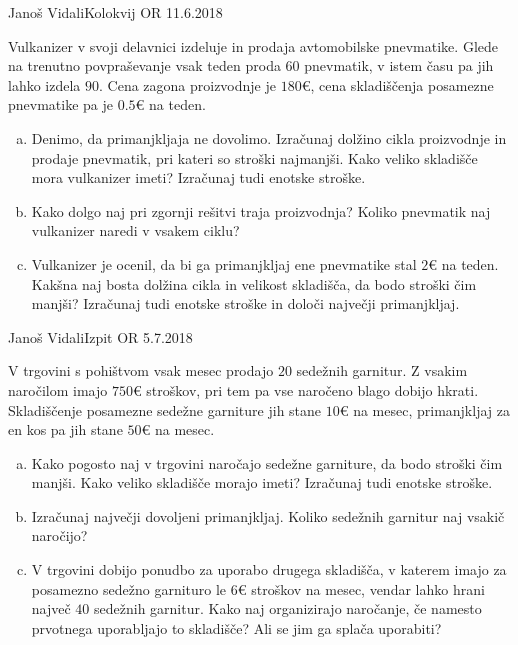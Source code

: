\begin{naloga}{Janoš Vidali}{Kolokvij OR 11.6.2018}
\begin{vprasanje}[vulkanizer]
Vulkanizer v svoji delavnici izdeluje in prodaja avtomobilske pnevmatike.
Glede na trenutno povpraševanje vsak teden proda $60$ pnevmatik,
v istem času pa jih lahko izdela $90$.
Cena zagona proizvodnje je $180 €$,
cena skladiščenja posamezne pnevmatike pa je $0.5 €$ na teden.

\begin{enumerate}[(a)]
\item Denimo, da primanjkljaja ne dovolimo.
Izračunaj dolžino cikla pro\-iz\-vod\-nje in prodaje pnevmatik,
pri kateri so stroški najmanjši.
Kako veliko skladišče mora vulkanizer imeti?
Izračunaj tudi enotske stroške.

\item Kako dolgo naj pri zgornji rešitvi traja proizvodnja?
Koliko pnevmatik naj vulkanizer naredi v vsakem ciklu?

\item Vulkanizer je ocenil,
da bi ga primanjkljaj ene pnevmatike stal $2 €$ na teden.
Kakšna naj bosta dolžina cikla in velikost skladišča,
da bodo stroški čim manjši?
Izračunaj tudi enotske stroške in določi največji primanjkljaj.
\end{enumerate}
\end{vprasanje}
\begin{odgovor}
\end{odgovor}
\end{naloga}


\begin{naloga}{Janoš Vidali}{Izpit OR 5.7.2018}
\begin{vprasanje}[sedezne]
V trgovini s pohištvom vsak mesec prodajo $20$ sedežnih garnitur.
Z vsakim naročilom imajo $750 €$ stroškov,
pri tem pa vse naročeno blago dobijo hkrati.
Skladiščenje posamezne sedežne garniture jih stane $10 €$ na mesec,
primanjkljaj za en kos pa jih stane $50 €$ na mesec.

\begin{enumerate}[(a)]
\item Kako pogosto naj v trgovini naročajo sedežne garniture,
da bodo stroški čim manjši.
Kako veliko skladišče morajo imeti?
Izračunaj tudi enotske stroške.

\item Izračunaj največji dovoljeni primanjkljaj.
Koliko sedežnih garnitur naj vsakič naročijo?

\item V trgovini dobijo ponudbo za uporabo drugega skladišča,
v katerem imajo za po\-sa\-mez\-no se\-dež\-no garnituro
le $6 €$ stroškov na mesec,
vendar lahko hrani največ $40$ sedežnih garnitur.
Kako naj organizirajo naročanje,
če namesto prvotnega uporabljajo to skladišče?
Ali se jim ga splača uporabiti?
\end{enumerate}
\end{vprasanje}
\begin{odgovor}
\end{odgovor}
\end{naloga}
